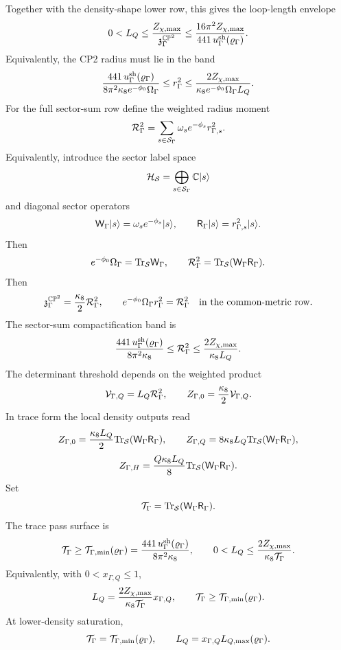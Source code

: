 \documentclass[11pt]{article}
\theoremstyle{definition}
\theoremstyle{remark}
\newcommand{\CP}{\mathbb{CP}}
\begin{document}
Together with the density-shape lower row, this gives the loop-length
envelope
\[
  0<L_Q
  \le
  \frac{Z_{\chi,\max}}{{\mathfrak z}_{\Gamma}^{\CP^2}}
  \le
  \frac{16\pi^2 Z_{\chi,\max}}
  {441\,u_\Gamma^{\rm sh}(\varrho_\Gamma)} .
\]
Equivalently, the CP2 radius must lie in the band
\[
  \frac{441\,u_\Gamma^{\rm sh}(\varrho_\Gamma)}
  {8\pi^2\kappa_8e^{-\phi_0}\Omega_\Gamma}
  \le
  r_\Gamma^2
  \le
  \frac{2Z_{\chi,\max}}
  {\kappa_8e^{-\phi_0}\Omega_\Gamma L_Q}.
\]
For the full sector-sum row define the weighted radius moment
\[
  {\cal R}_\Gamma^2
  =
  \sum_{s\in{\cal S}_\Gamma}
  \omega_s e^{-\phi_s}r_{\Gamma,s}^2 .
\]
Equivalently, introduce the sector label space
\[
  {\cal H}_{\cal S}
  =
  \bigoplus_{s\in{\cal S}_\Gamma}\mathbb C|s\rangle
\]
and diagonal sector operators
\[
  {\sf W}_\Gamma|s\rangle
  =
  \omega_s e^{-\phi_s}|s\rangle,
  \qquad
  {\sf R}_\Gamma|s\rangle
  =
  r_{\Gamma,s}^2|s\rangle .
\]
Then
\[
  e^{-\phi_0}\Omega_\Gamma={\rm Tr}_{\cal S}{\sf W}_\Gamma,
  \qquad
  {\cal R}_\Gamma^2
  =
  {\rm Tr}_{\cal S}({\sf W}_\Gamma{\sf R}_\Gamma).
\]
Then
\[
  {\mathfrak z}_{\Gamma}^{\CP^2}
  =
  \frac{\kappa_8}{2}{\cal R}_\Gamma^2,
  \qquad
  e^{-\phi_0}\Omega_\Gamma r_\Gamma^2
  =
  {\cal R}_\Gamma^2
  \quad
  \hbox{in the common-metric row}.
\]
The sector-sum compactification band is
\[
  \frac{441\,u_\Gamma^{\rm sh}(\varrho_\Gamma)}
  {8\pi^2\kappa_8}
  \le
  {\cal R}_\Gamma^2
  \le
  \frac{2Z_{\chi,\max}}{\kappa_8L_Q}.
\]
The determinant threshold depends on the weighted product
\[
  {\cal V}_{\Gamma,Q}
  =
  L_Q{\cal R}_\Gamma^2,
  \qquad
  Z_{\Gamma,0}
  =
  \frac{\kappa_8}{2}{\cal V}_{\Gamma,Q}.
\]
In trace form the local density outputs read
\[
  Z_{\Gamma,0}
  =
  \frac{\kappa_8L_Q}{2}
  {\rm Tr}_{\cal S}({\sf W}_\Gamma{\sf R}_\Gamma),
  \qquad
  Z_{\Gamma,Q}
  =
  8\kappa_8L_Q
  {\rm Tr}_{\cal S}({\sf W}_\Gamma{\sf R}_\Gamma),
\]
\[
  Z_{\Gamma,H}
  =
  \frac{Q\kappa_8L_Q}{8}
  {\rm Tr}_{\cal S}({\sf W}_\Gamma{\sf R}_\Gamma).
\]
Set
\[
  {\cal T}_\Gamma
  =
  {\rm Tr}_{\cal S}({\sf W}_\Gamma{\sf R}_\Gamma).
\]
The trace pass surface is
\[
  {\cal T}_\Gamma
  \ge
  {\cal T}_{\Gamma,\min}(\varrho_\Gamma)
  =
  \frac{441\,u_\Gamma^{\rm sh}(\varrho_\Gamma)}
  {8\pi^2\kappa_8},
  \qquad
  0<L_Q\le
  \frac{2Z_{\chi,\max}}{\kappa_8{\cal T}_\Gamma}.
\]
Equivalently, with \(0<x_{\Gamma,Q}\le1\),
\[
  L_Q
  =
  \frac{2Z_{\chi,\max}}{\kappa_8{\cal T}_\Gamma}
  x_{\Gamma,Q},
  \qquad
  {\cal T}_\Gamma\ge
  {\cal T}_{\Gamma,\min}(\varrho_\Gamma).
\]
At lower-density saturation,
\[
  {\cal T}_\Gamma={\cal T}_{\Gamma,\min}(\varrho_\Gamma),
  \qquad
  L_Q=x_{\Gamma,Q}L_{Q,\max}(\varrho_\Gamma).
\]
\end{document}
